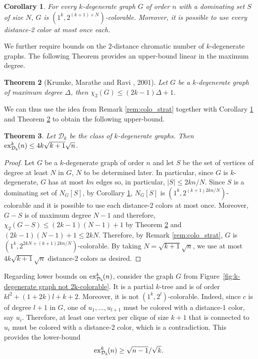 \documentclass{article}
\newtheorem{theorem}{Theorem}
\newtheorem{corollary}[theorem]{Corollary}
\newcommand{\colo}[2]{(1^{#1}, 2^{#2})}
\newcommand{\ex}[3]{\operatorname{ex}^{#1}_{#2}\hspace{-3pt}{#3}}
\begin{document}
\begin{corollary}\label{coro:k-degenerate-dominated-colo-bound}
    For every $k$-degenerate graph $G$ of order $n$ with a dominating set $S$ of size $N$, $G$ is $\colo{k}{(k + 1)\times N}$-colorable. Moreover, it is possible to use every distance-2 color at most once each.
\end{corollary}

We further require bounds on the $2$-distance chromatic number of $k$-degenerate graphs. The following Theorem provides an upper-bound linear in the maximum degree.

\begin{theorem}[Krumke, Marathe and Ravi \cite{krumke2001models}, 2001]\label{thm:dist-2_colo_of_k-dege}
    Let $G$ be a $k$-degenerate graph of maximum degree $\Delta$, then $\chi_2(G) \le (2k - 1)\Delta + 1$.
\end{theorem}

We can thus use the idea from Remark \ref{rem:colo_strat} together with Corollary \ref{coro:k-degenerate-dominated-colo-bound} and Theorem \ref{thm:dist-2_colo_of_k-dege} to obtain the following upper-bound.

\begin{theorem}\label{thm:coloring_k_degenerate_graphs}
   Let $\mathcal{D}_k$ be the class of $k$-degenerate graphs. Then $\ex{k}{\mathcal{D}_k}{(n)} \leq 4k\sqrt{k + 1}\sqrt{n}$.
\end{theorem}

\begin{proof}
    Let $G$ be a $k$-degenerate graph of order $n$ and let $S$ be the set of vertices of degree at least $N$ in $G$, $N$ to be determined later. In particular, since $G$ is $k$-degenerate, $G$ has at most $kn$ edges so, in particular, $|S| \le 2kn/N$. Since $S$ is a dominating set of $N_G[S]$, by Corollary \ref{coro:k-degenerate-dominated-colo-bound}, $N_G[S]$ is $\colo{k}{(k + 1)2kn/N}$-colorable and it is possible to use each distance-2 colors at most once. Moreover, $G - S$ is of maximum degree $N - 1$ and therefore, $\chi_2(G - S) \le (2k - 1)(N - 1) + 1$ by Theorem \ref{thm:dist-2_colo_of_k-dege} and $(2k - 1)(N - 1) + 1 \le 2kN$. Therefore, by Remark \ref{rem:colo_strat}, $G$ is $\colo{k}{2kN + (k + 1)2kn/N}$-colorable. By taking $N = \sqrt{k + 1}\sqrt{n}$, we use at most $4k\sqrt{k + 1}\sqrt{n}$ distance-2 colors as desired.
\end{proof}

Regarding lower bounds on $\ex{k}{\mathcal{D}_k}{(n)}$, consider the graph $G$ from Figure~\ref{fig:k-degenerate graph not 2k-colorable}. It is a partial $k$-tree and is of order $kl^2 + (1 + 2k)l + k + 2$. Moreover, it is not $\colo{k}{l}$-colorable. Indeed, since $c$ is of degree $l + 1$ in $G$, one of $u_1, \dots, u_{l + 1}$ must be colored with a distance-1 color, say $u_i$. Therefore, at least one vertex per clique of size $k + 1$ that is connected to $u_i$ must be colored with a distance-2 color, which is a contradiction. This provides the lower-bound \[\ex{k}{\mathcal{D}_k}{(n)} \ge \sqrt{n - 1}/\sqrt{k}.\]
\end{document}
